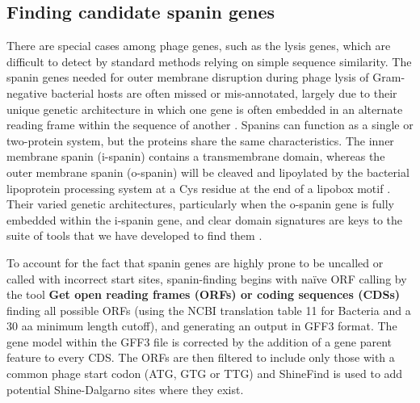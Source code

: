 \subsection*{Finding candidate spanin genes}

There are special cases among phage genes, such as the lysis genes,
which are difficult to detect by standard methods relying on simple
sequence similarity. The spanin genes needed for outer membrane
disruption during phage lysis of Gram-negative bacterial hosts are often
missed or mis-annotated, largely due to their unique genetic
architecture in which one gene is often embedded in an alternate reading
frame within the sequence of another \cite{Kongari_2018}. Spanins can function as a
single or two-protein system, but the proteins share the same
characteristics. The inner membrane spanin (i-spanin) contains a
transmembrane domain, whereas the outer membrane spanin (o-spanin) will
be cleaved and lipoylated by the bacterial lipoprotein processing system
at a Cys residue at the end of a lipobox motif \cite{Babu_2006,von_Heijne_1989}. Their varied
genetic architectures, particularly when the o-spanin gene is fully
embedded within the i-spanin gene, and clear domain signatures are keys
to the suite of tools that we have developed to find them \cite{Cahill_2019}.

To account for the fact that spanin genes are highly prone to be
uncalled or called with incorrect start sites, spanin-finding begins
with naïve ORF calling by the tool \textbf{Get open reading frames
(ORFs) or coding sequences (CDSs)} \cite{Cock_2013,Cock_2009} finding all possible ORFs
(using the NCBI translation table 11 for Bacteria and a 30 aa minimum
length cutoff), and generating an output in GFF3 format. The gene model
within the GFF3 file is corrected by the addition of a gene parent
feature to every CDS. The ORFs are then filtered to include only those
with a common phage start codon (ATG, GTG or TTG) and ShineFind is used
to add potential Shine-Dalgarno sites where they exist.

